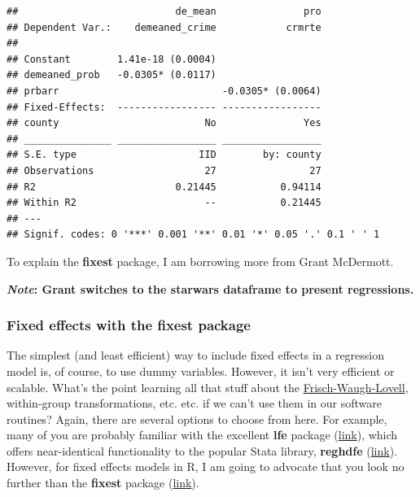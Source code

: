\documentclass[
]{article}
\begin{document}
\begin{verbatim}
##                           de_mean               pro
## Dependent Var.:    demeaned_crime            crmrte
##                                                    
## Constant        1.41e-18 (0.0004)                  
## demeaned_prob   -0.0305* (0.0117)                  
## prbarr                            -0.0305* (0.0064)
## Fixed-Effects:  ----------------- -----------------
## county                         No               Yes
## _______________ _________________ _________________
## S.E. type                     IID        by: county
## Observations                   27                27
## R2                        0.21445           0.94114
## Within R2                      --           0.21445
## ---
## Signif. codes: 0 '***' 0.001 '**' 0.01 '*' 0.05 '.' 0.1 ' ' 1
\end{verbatim}

To explain the \textbf{fixest} package, I am borrowing more from Grant
McDermott.

\textbf{\emph{Note}: Grant switches to the starwars dataframe to present
regressions.}

\hypertarget{fixed-effects-with-the-fixest-package}{%
\subsubsection{\texorpdfstring{Fixed effects with the \textbf{fixest}
package}{Fixed effects with the fixest package}}\label{fixed-effects-with-the-fixest-package}}

The simplest (and least efficient) way to include fixed effects in a
regression model is, of course, to use dummy variables. However, it
isn't very efficient or scalable. What's the point learning all that
stuff about the
\href{https://en.wikipedia.org/wiki/Frisch\%E2\%80\%93Waugh\%E2\%80\%93Lovell_theorem}{Frisch-Waugh-Lovell},
within-group transformations, etc. etc. if we can't use them in our
software routines? Again, there are several options to choose from here.
For example, many of you are probably familiar with the excellent
\textbf{lfe} package
(\href{https://cran.r-project.org/web/packages/lfe/index.html}{link}),
which offers near-identical functionality to the popular Stata library,
\textbf{reghdfe} (\href{http://scorreia.com/software/reghdfe/}{link}).
However, for fixed effects models in R, I am going to advocate that you
look no further than the \textbf{fixest} package
(\href{https://lrberge.github.io/fixest}{link}).
\end{document}
